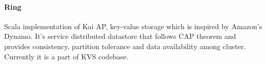 \paragraph{Ring}
Scala implementation of Kai AP, key-value storage which is inspired by Amazon's Dynamo. It's service distributed datastore that
follows CAP theorem and provides consistency, partition tolerance and data availability among cluster. Currently it is a part of KVS codebase.

